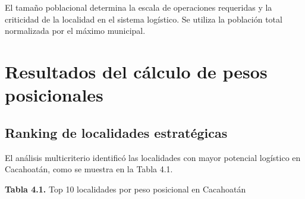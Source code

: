 \documentclass[
  spanish,
  us-letterpaper,
]{scrreprt}
\numberwithin{equation}{chapter} %
\begin{document}
El tamaño poblacional determina la escala de operaciones requeridas y la
criticidad de la localidad en el sistema logístico. Se utiliza la
población total normalizada por el máximo municipal.

\section{Resultados del cálculo de pesos
posicionales}\label{resultados-del-cuxe1lculo-de-pesos-posicionales}

\subsection{Ranking de localidades
estratégicas}\label{ranking-de-localidades-estratuxe9gicas}

El análisis multicriterio identificó las localidades con mayor potencial
logístico en Cacahoatán, como se muestra en la Tabla 4.1.

\textbf{Tabla 4.1.} Top 10 localidades por peso posicional en Cacahoatán
\end{document}
